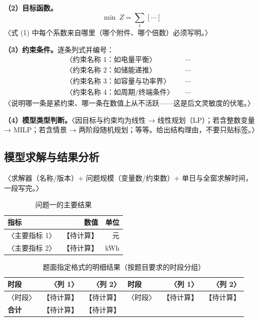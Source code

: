 \documentclass[12pt,a4paper]{ctexart}
\newif\ifwritemode
\newcommand{\ph}[1][待计算]{\textcolor{phred}{【#1】}}
\newcommand{\guide}[1]{%
  \ifwritemode\par\noindent{\small\color{guideblue}\textbf{【写作提示】}#1}\par\fi}
\newcommand{\tabhead}[1]{\textbf{#1}}
\begin{document}
\noindent\textbf{（2）目标函数。}
\begin{equation}\label{eq:q1-obj}
  \min\ Z=\sum_{t}\ \bigl[\ \cdots\ \bigr]
\end{equation}
〈式 (1) 中每个系数来自哪里（哪个附件、哪个倍数）必须写明。〉

\noindent\textbf{（3）约束条件。}逐条列式并编号：
\begin{align}
  &\text{〈约束名称 1：如电量平衡〉} & &\cdots & &\label{eq:q1-c1}\\
  &\text{〈约束名称 2：如储能递推〉} & &\cdots & &\label{eq:q1-c2}\\
  &\text{〈约束名称 3：如容量与功率界〉} & &\cdots & &\label{eq:q1-c3}\\
  &\text{〈约束名称 4：如周期/终端条件〉} & &\cdots & &\label{eq:q1-c4}
\end{align}
〈说明哪一条是紧约束、哪一条在数值上从不活跃——这是后文灵敏度的伏笔。〉

\noindent\textbf{（4）模型类型判断。}〈因目标与约束均为线性 → 线性规划（LP）；若含整数变量 → MILP；若含情景 → 两阶段随机规划；等等。给出结构理由，不要只贴标签。〉

\subsection{模型求解与结果分析}
\guide{四件固定：求解器与算法 1 段 → 总结果表 → 代表样本明细表（题面指定样本必须给全）→ 1 张图。算法细节压成伪代码块或移附录 C。}

\noindent〈求解器（名称/版本）+ 问题规模（变量数/约束数）+ 单日与全窗求解时间，一段写完。〉

\begin{table}[htbp]\centering\small
  \caption{问题一的主要结果}\label{tab:q1-main}
  \begin{tabular}{lrr}
    \toprule
    \tabhead{指标} & \tabhead{数值} & \tabhead{单位} \\
    \midrule
    〈主要指标 1〉 & \ph & 元 \\
    〈主要指标 2〉 & \ph & kWh \\
    \bottomrule
  \end{tabular}
\end{table}

\begin{table}[htbp]\centering\footnotesize
  \caption{题面指定格式的明细结果（按题目要求的时段分组）}\label{tab:q1-detail}
  \begin{tabular}{lrrlrr}
    \toprule
    \tabhead{时段} & \tabhead{〈列 1〉} & \tabhead{〈列 2〉} & \tabhead{时段} & \tabhead{〈列 1〉} & \tabhead{〈列 2〉} \\
    \midrule
    〈时段〉 & \ph & \ph & 〈时段〉 & \ph & \ph \\
    \midrule
    \tabhead{合计} & \ph & \ph & & & \\
    \bottomrule
  \end{tabular}
\end{table}
\end{document}
